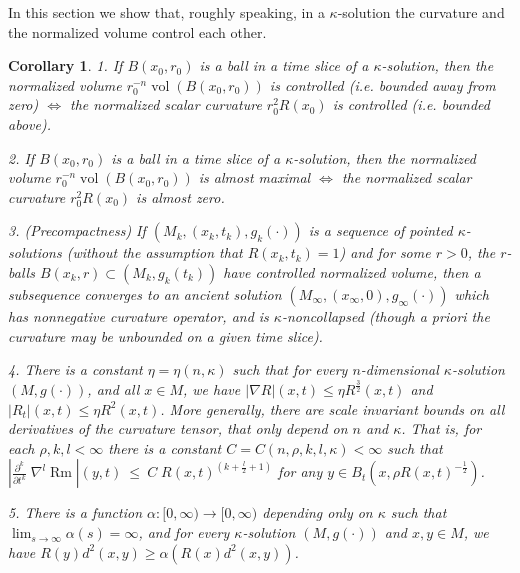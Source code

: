 \documentclass[12pt]{amsart}
\newcommand{\al}{\alpha}
\newcommand{\D}{\partial}
\newcommand{\Rm}{\operatorname{Rm}}
\newcommand{\vol}{\operatorname{vol}}
\newcommand{\ra}{\rightarrow}
\numberwithin{equation}{section}
\theoremstyle{plain}
\newtheorem{corollary}[equation]{Corollary}
\theoremstyle{definition}
\theoremstyle{remark}
\begin{document}
In this section we show that, roughly speaking, in a 
$\kappa$-solution
the curvature and the normalized volume control each other.


\begin{corollary} \label{11.4cors}
1.  If $B(x_0,r_0)$ is a ball in a time slice of a $\kappa$-solution,
then the normalized volume $r_0^{-n}\vol(B(x_0,r_0))$ is controlled
(i.e. bounded away from zero) $\Longleftrightarrow$
the normalized scalar curvature $r_0^2R(x_0)$ is controlled
(i.e. bounded above).

2. If $B(x_0,r_0)$ is a ball in a time slice of a $\kappa$-solution,
then the normalized volume $r_0^{-n}\vol(B(x_0,r_0))$ is almost
maximal $\Longleftrightarrow$
the normalized scalar curvature $r_0^2R(x_0)$ is almost zero.

3. (Precompactness) 
If $(M_k,(x_k,t_k),g_k(\cdot))$ is a sequence of pointed $\kappa$-solutions
(without the assumption that $R(x_k, t_k) = 1$)
and for some $r>0$, the $r$-balls $B(x_k,r)\subset (M_k,g_k(t_k))$ 
have controlled normalized volume, then a subsequence converges
to an ancient solution $(M_\infty,(x_\infty,0),g_\infty(\cdot))$
which has nonnegative curvature operator, and is $\kappa$-noncollapsed
(though {\it a priori} the curvature may be unbounded on a given time slice).

4. 
There is a constant 
$\eta=\eta(n,\kappa)$ such that for every $n$-dimensional
$\kappa$-solution $(M,g(\cdot))$, and all $x\in M$, we have
$|\nabla R|(x,t)\leq \eta R^{\frac{3}{2}}(x,t)$ and
$|R_t|(x,t) \leq \eta R^2(x,t)$.
More generally, there are scale invariant bounds on 
all derivatives of the curvature tensor, that only depend
on 
$n$ and
$\kappa$. That is, for 
each $\rho,k,l<\infty$ there is a constant 
$C=C(n,\rho,k,l,\kappa) < \infty$
such that 
$\left|\frac{\D^k}{\D t^k}\; 
\nabla^l\Rm\right|(y,t) \: \le \: C\;R(x,t)^{(k+\frac{l}{2}+1)}$ for any
$y \in B_t(x,\rho R(x,t)^{-\frac12})$.

 
5.  There is a function $\al:[0,\infty)\ra[0,\infty)$ depending only
on $\kappa$ such that $\lim_{s\ra\infty}\al(s)=\infty$,
and  for every  $\kappa$-solution $(M,g(\cdot))$ and
$x,y\in M$, we have $R(y)d^2(x,y)\geq \al(R(x)d^2(x,y))$.
\end{corollary}
\end{document}
